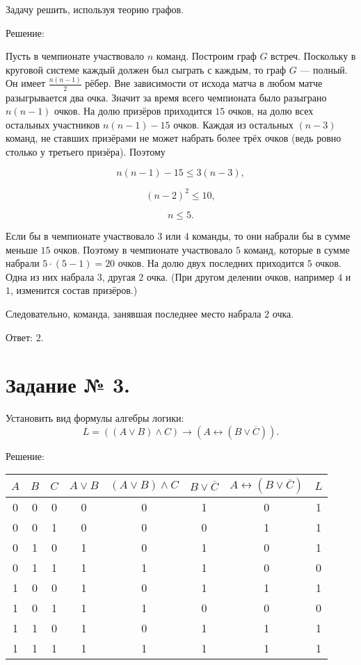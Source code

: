 \documentclass[fleqn]{article}
\renewcommand{\leq}{\ensuremath{\leqslant}}
\begin{document}
Задачу решить, используя теорию графов.

\begin{center}Решение:\end{center}

Пусть в чемпионате участвовало $n$ команд. Построим граф $G$ встреч. Поскольку в круговой системе каждый должен был сыграть с каждым, то граф $G$ --- полный. Он имеет $\frac{n(n-1)}{2}$ рёбер. Вне зависимости от исхода матча в любом матче разыгрывается два очка. Значит за время всего чемпионата было разыграно $n(n-1)$ очков. На долю призёров приходится $15$ очков, на долю всех остальных участников $n(n-1)-15$ очков. Каждая из остальных $(n-3)$ команд, не ставших призёрами не может набрать более трёх очков (ведь ровно столько у третьего призёра). Поэтому

$$n(n-1)-15\leq3(n-3),$$

$$(n-2)^2\leq10,$$

$$n\leq5.$$

Если бы в чемпионате участвовало $3$ или $4$ команды, то они набрали бы в сумме меньше $15$ очков. Поэтому в чемпионате участвовало $5$ команд, которые в сумме набрали $5\cdot(5-1)=20$ очков. На долю двух последних приходится $5$ очков. Одна из них набрала $3$, другая $2$ очка. (При другом делении очков, например $4$ и $1$, изменится состав призёров.)

Следовательно, команда, занявшая последнее место набрала $2$ очка.

Ответ: 2.

\section*{Задание № 3.}

Установить вид формулы алгебры логики:
$$L = ((A \vee B) \wedge C) \to (A \leftrightarrow (B \vee \overline{C} )).$$

\begin{center}Решение:\end{center}

\medskip
\bgroup
\def\arraystretch{1.5}
\setlength{}
\begin{tabular}{|c|c|c|c|c|c|c|c|}
\hline
$A$ & $B$ & $C$ & $A \vee B$ & $(A \vee B) \wedge C$ & $B \vee \overline{C}$ & $A\leftrightarrow(B\vee\overline{C})$ & $L$ \\
\hline
0 & 0 & 0 & 0 & 0 & 1 & 0 & 1 \\
\hline
0 & 0 & 1 & 0 & 0 & 0 & 1 & 1 \\
\hline
0 & 1 & 0 & 1 & 0 & 1 & 0 & 1 \\
\hline
0 & 1 & 1 & 1 & 1 & 1 & 0 & 0 \\
\hline
1 & 0 & 0 & 1 & 0 & 1 & 1 & 1 \\
\hline
1 & 0 & 1 & 1 & 1 & 0 & 0 & 0 \\
\hline
1 & 1 & 0 & 1 & 0 & 1 & 1 & 1 \\
\hline
1 & 1 & 1 & 1 & 1 & 1 & 1 & 1 \\
\hline
\end{tabular}
\egroup
\medskip
\end{document}
